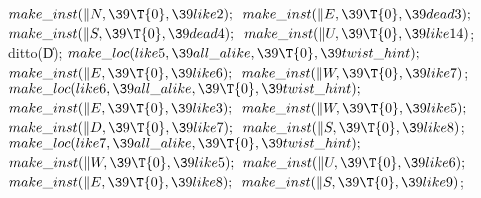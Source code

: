 ${}\\{make\_inst}(\|N,\39\T{0},\39\\{like2});{}$\6
${}\\{make\_inst}(\|E,\39\T{0},\39\\{dead3});{}$\6
${}\\{make\_inst}(\|S,\39\T{0},\39\\{dead4});{}$\6
${}\\{make\_inst}(\|U,\39\T{0},\39\\{like14}){}$;\5
\\{ditto}(\|D);\7
${}\\{make\_loc}(\\{like5},\39\\{all\_alike},\39\T{0},\39\\{twist\_hint});{}$\6
${}\\{make\_inst}(\|E,\39\T{0},\39\\{like6});{}$\6
${}\\{make\_inst}(\|W,\39\T{0},\39\\{like7}){}$;\7
${}\\{make\_loc}(\\{like6},\39\\{all\_alike},\39\T{0},\39\\{twist\_hint});{}$\6
${}\\{make\_inst}(\|E,\39\T{0},\39\\{like3});{}$\6
${}\\{make\_inst}(\|W,\39\T{0},\39\\{like5});{}$\6
${}\\{make\_inst}(\|D,\39\T{0},\39\\{like7});{}$\6
${}\\{make\_inst}(\|S,\39\T{0},\39\\{like8}){}$;\7
${}\\{make\_loc}(\\{like7},\39\\{all\_alike},\39\T{0},\39\\{twist\_hint});{}$\6
${}\\{make\_inst}(\|W,\39\T{0},\39\\{like5});{}$\6
${}\\{make\_inst}(\|U,\39\T{0},\39\\{like6});{}$\6
${}\\{make\_inst}(\|E,\39\T{0},\39\\{like8});{}$\6
${}\\{make\_inst}(\|S,\39\T{0},\39\\{like9}){}$;\7
